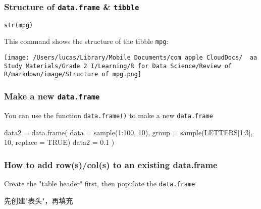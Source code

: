\documentclass[
]{article}
\let\oldincludegraphics\includegraphics
\renewcommand{\includegraphics}[2][]{\begin{center}\oldincludegraphics[#1]{#2}\end{center}}
\newenvironment{Shaded}{}{}
\newcommand{\AttributeTok}[1]{\textcolor[rgb]{0.49,0.56,0.16}{#1}}
\newcommand{\ConstantTok}[1]{\textcolor[rgb]{0.53,0.00,0.00}{#1}}
\newcommand{\DecValTok}[1]{\textcolor[rgb]{0.25,0.63,0.44}{#1}}
\newcommand{\FloatTok}[1]{\textcolor[rgb]{0.25,0.63,0.44}{#1}}
\newcommand{\FunctionTok}[1]{\textcolor[rgb]{0.02,0.16,0.49}{#1}}
\newcommand{\NormalTok}[1]{#1}
\newcommand{\OtherTok}[1]{\textcolor[rgb]{0.00,0.44,0.13}{#1}}
\newcommand{\SpecialCharTok}[1]{\textcolor[rgb]{0.25,0.44,0.63}{#1}}
\begin{document}
\hypertarget{structure-of-dataframe--tibble}{%
\subsubsection{\texorpdfstring{Structure of \texttt{data.frame} \&
\texttt{tibble}}{Structure of data.frame \& tibble}}\label{structure-of-dataframe--tibble}}

\texttt{str(mpg)}

This command shows the structure of the tibble \texttt{mpg}:

\texttt{[image: /Users/lucas/Library/Mobile Documents/com~apple~CloudDocs/~~aa Study Materials/Grade 2 I/Learning/R for Data Science/Review of R/markdown/image/Structure of mpg.png]}

\hypertarget{make-a-new-dataframe}{%
\subsubsection{\texorpdfstring{Make a new
\texttt{data.frame}}{Make a new data.frame}}\label{make-a-new-dataframe}}

You can use the function \texttt{data.frame()} to make a new
\texttt{data.frame}

\begin{Shaded}
\begin{Highlighting}[]
\NormalTok{data2 }\OtherTok{=}
	\FunctionTok{data.frame}\NormalTok{(}
  	\AttributeTok{data =} \FunctionTok{sample}\NormalTok{(}\DecValTok{1}\SpecialCharTok{:}\DecValTok{100}\NormalTok{, }\DecValTok{10}\NormalTok{),}
    \AttributeTok{group =} \FunctionTok{sample}\NormalTok{(LETTERS[}\DecValTok{1}\SpecialCharTok{:}\DecValTok{3}\NormalTok{], }\DecValTok{10}\NormalTok{, }\AttributeTok{replace =} \ConstantTok{TRUE}\NormalTok{)}
    \AttributeTok{data2 =} \FloatTok{0.1}
\NormalTok{  )}
\end{Highlighting}
\end{Shaded}

\hypertarget{how-to-add-rowscols-to-an-existing-dataframe}{%
\subsubsection{How to add row(s)/col(s) to an existing
data.frame}\label{how-to-add-rowscols-to-an-existing-dataframe}}

Create the "table header" first, then populate the \texttt{data.frame}

先创建"表头"，再填充
\end{document}
